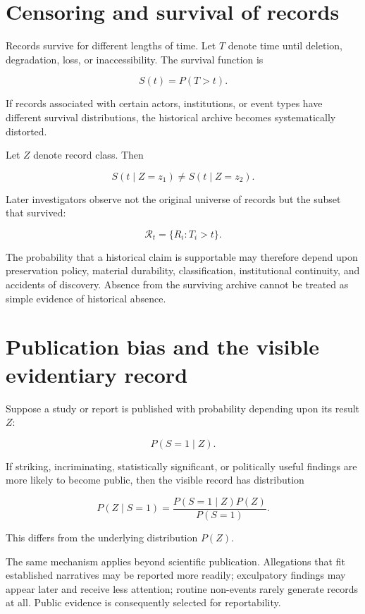 \section{Censoring and survival of records}
\label{sec:a41}

Records survive for different lengths of time. Let \(T\) denote time until deletion, degradation, loss, or inaccessibility. The survival function is

\[
S(t)=P(T>t).
\]

If records associated with certain actors, institutions, or event types have different survival distributions, the historical archive becomes systematically distorted.

Let \(Z\) denote record class. Then

\[
S(t\mid Z=z_1)
\neq
S(t\mid Z=z_2).
\]

Later investigators observe not the original universe of records but the subset that survived:

\[
\mathcal R_t
=
\{R_i:T_i>t\}.
\]

The probability that a historical claim is supportable may therefore depend upon preservation policy, material durability, classification, institutional continuity, and accidents of discovery. Absence from the surviving archive cannot be treated as simple evidence of historical absence.

\section{Publication bias and the visible evidentiary record}
\label{sec:a42}

Suppose a study or report is published with probability depending upon its result \(Z\):

\[
P(S=1\mid Z).
\]

If striking, incriminating, statistically significant, or politically useful findings are more likely to become public, then the visible record has distribution

\[
P(Z\mid S=1)
=
\frac{P(S=1\mid Z)P(Z)}
{P(S=1)}.
\]

This differs from the underlying distribution \(P(Z)\).

The same mechanism applies beyond scientific publication. Allegations that fit established narratives may be reported more readily; exculpatory findings may appear later and receive less attention; routine non-events rarely generate records at all. Public evidence is consequently selected for reportability.


